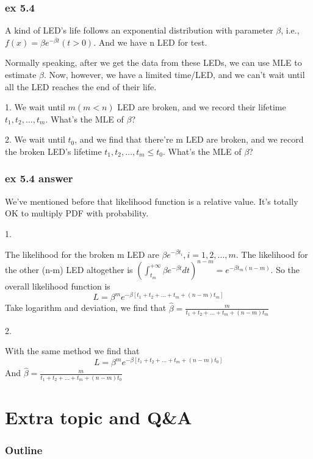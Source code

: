 \documentclass{beamer}
\begin{document}
\begin{frame}
    \frametitle{ex 5.4}
    A kind of LED's life follows an exponential distribution with parameter $\beta$, i.e., $f(x)=\beta e^{-\beta t}(t>0)$. And we have n LED for test.\par
    Normally speaking, after we get the data from these LEDs, we can use MLE to estimate $\beta$. Now, however, we have a limited time/LED, and we can't wait until all the LED reaches the end of their life.\par
    \vspace{0.3cm}
    1. We wait until $m(m<n)$ LED are broken, and we record their lifetime $t_1, t_2, \dots , t_m$. What's the MLE of $\beta$?\par
    \vspace{0.3cm}
    2. We wait until $t_0$, and we find that there're m LED are broken, and we record the broken LED's lifetime $t_1, t_2, \dots , t_m \leq t_0$. What's the MLE of $\beta$?\par

\end{frame}

\begin{frame}
    \frametitle{ex 5.4 answer}
    We've mentioned before that likelihood function is a relative value. It's totally OK to multiply PDF with probability.\par
    1. \par
    The likelihood for the broken m LED are $\beta e^{-\beta t_{i}}, i=1,2,\dots , m$. The likelihood for the other (n-m) LED altogether is $(\int_{t_m}^{+\infty}\beta e^{-\beta t} dt)^{n-m}=e^{-\beta t_m (n-m)}$. So the overall likelihood function is
    \[L=\beta^{m} e^{-\beta [t_1+t_2+\dots +t_m+(n-m) t_m]}\]
    Take logarithm and deviation, we find that $\hat{\beta}=\frac{m}{t_1+t_2+\dots +t_m+(n-m) t_m}$\par
    2.\par
    With the same method we find that
    \[L=\beta^{m} e^{-\beta [t_1+t_2+\dots +t_m+(n-m) t_0]}\]
    And $\hat{\beta}=\frac{m}{t_1+t_2+\dots +t_m+(n-m) t_0}$

\end{frame}

\section{Extra topic and Q\&A}
\begin{frame}
    \frametitle{Outline}
    \tableofcontents[currentsection]
\end{frame}
\end{document}
